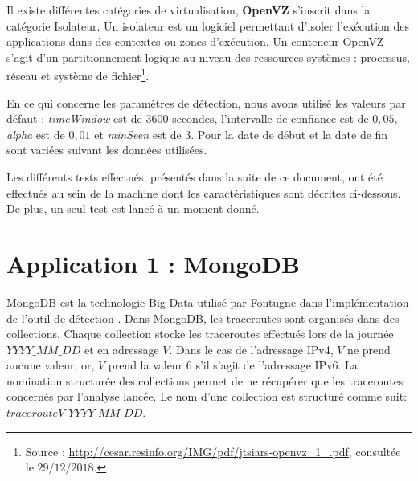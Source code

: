 \begin{tcolorbox}
	
	Il existe différentes catégories de virtualisation, \textbf{OpenVZ} s'inscrit dans la catégorie Isolateur. Un isolateur est un logiciel permettant d'isoler l'exécution des applications dans des contextes ou zones d'exécution. Un conteneur OpenVZ s'agit d'un partitionnement logique au niveau des ressources systèmes : processus, réseau et système de fichier\footnote{Source : \url{http://cesar.resinfo.org/IMG/pdf/jtsiars-openvz_1_.pdf}, consultée le $29/12/2018$.}.
\end{tcolorbox}


En ce qui concerne les paramètres de détection, nous avons utilisé les valeurs par défaut : \textit{timeWindow} est de $ 3600 $ secondes, l'intervalle de confiance est de $0,05$, \textit{alpha} est de $ 0,01 $ et \textit{minSeen} est de $3$. Pour la date de début et la date de fin sont variées suivant les données utilisées.

Les différents tests effectués, présentés dans la suite de ce document, ont été effectués  au sein de la machine dont les caractéristiques sont décrites ci-dessous. De plus, un seul test est lancé à un moment donné.

\section{Application 1 : MongoDB}

MongoDB est la technologie Big Data utilisé par  Fontugne  dans l'implémentation de l'outil de détection \cite{InternetHealthReport}. Dans MongoDB, les traceroutes sont organisés  dans des collections.  Chaque collection stocke les traceroutes effectués lors de la journée $YYYY\_MM\_DD$ et en adressage $V$. Dans le  cas de l'adressage IPv4, $V$  ne prend aucune valeur,  or, $V$ prend la valeur $6$ s'il s'agit de l'adressage IPv6.  La nomination structurée des collections permet de ne récupérer que les traceroutes concernés par l'analyse lancée. Le nom d'une collection est structuré comme suit: 	$tracerouteV\_YYYY\_MM\_DD$.
 

